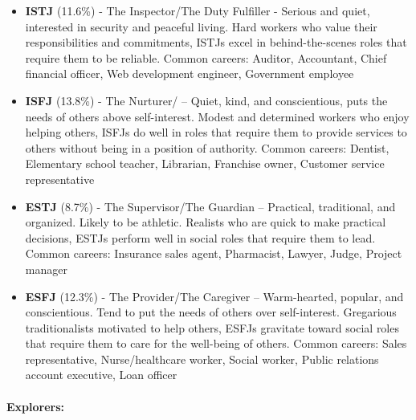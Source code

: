 \documentclass[]{book}
\let\oldparagraph\paragraph
\renewcommand{\paragraph}[1]{\oldparagraph{#1}\mbox{}}
\begin{document}
\begin{itemize}
\item
  \textbf{ISTJ} (11.6\%) - The Inspector/The Duty Fulfiller - Serious and quiet, interested in security and peaceful living. Hard workers who value their responsibilities and commitments, ISTJs excel in behind-the-scenes roles that require them to be reliable. Common careers: Auditor, Accountant, Chief financial officer, Web development engineer, Government employee
\item
  \textbf{ISFJ} (13.8\%) - The Nurturer/ -- Quiet, kind, and conscientious, puts the needs of others above self-interest. Modest and determined workers who enjoy helping others, ISFJs do well in roles that require them to provide services to others without being in a position of authority. Common careers: Dentist, Elementary school teacher, Librarian, Franchise owner, Customer service representative
\item
  \textbf{ESTJ} (8.7\%) - The Supervisor/The Guardian -- Practical, traditional, and organized. Likely to be athletic. Realists who are quick to make practical decisions, ESTJs perform well in social roles that require them to lead. Common careers: Insurance sales agent, Pharmacist, Lawyer, Judge, Project manager
\item
  \textbf{ESFJ} (12.3\%) - The Provider/The Caregiver -- Warm-hearted, popular, and conscientious. Tend to put the needs of others over self-interest. Gregarious traditionalists motivated to help others, ESFJs gravitate toward social roles that require them to care for the well-being of others. Common careers: Sales representative, Nurse/healthcare worker, Social worker, Public relations account executive, Loan officer
\end{itemize}

\hypertarget{explorers}{%
\paragraph{Explorers:}\label{explorers}}
\end{document}
